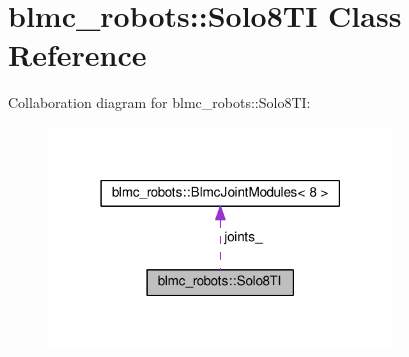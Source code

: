 \hypertarget{classblmc__robots_1_1Solo8TI}{}\section{blmc\+\_\+robots\+:\+:Solo8\+TI Class Reference}
\label{classblmc__robots_1_1Solo8TI}


Collaboration diagram for blmc\+\_\+robots\+:\+:Solo8\+TI\+:
\nopagebreak
\begin{figure}[H]
\begin{center}
\leavevmode
\includegraphics[width=259pt]{classblmc__robots_1_1Solo8TI__coll__graph}
\end{center}
\end{figure}
